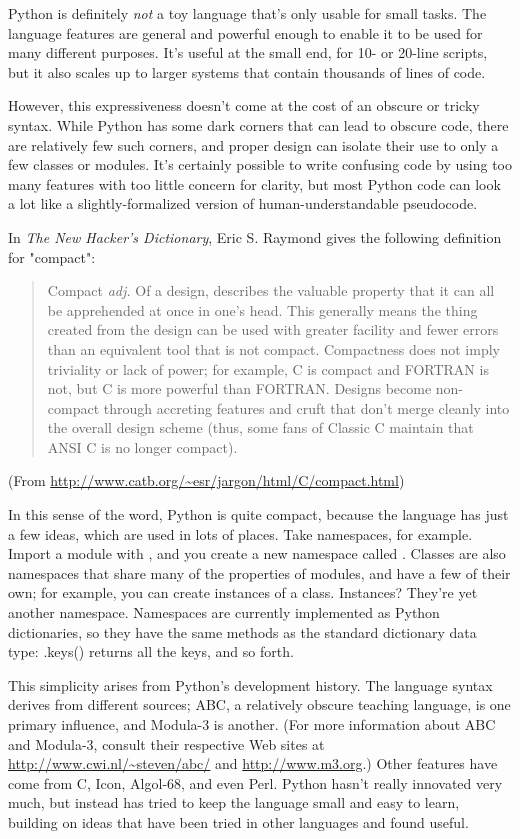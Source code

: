 \documentclass{howto}
\begin{document}
Python is definitely \emph{not} a toy language that's only usable for
small tasks.  The language features are general and powerful enough to
enable it to be used for many different purposes.  It's useful at the
small end, for 10- or 20-line scripts, but it also scales up to larger
systems that contain thousands of lines of code.

However, this expressiveness doesn't come at the cost of an obscure or
tricky syntax.  While Python has some dark corners that can lead to
obscure code, there are relatively few such corners, and proper design
can isolate their use to only a few classes or modules.  It's
certainly possible to write confusing code by using too many features
with too little concern for clarity, but most Python code can look a
lot like a slightly-formalized version of human-understandable
pseudocode.

In \emph{The New Hacker's Dictionary}, Eric S. Raymond gives the following
definition for "compact":

\begin{quotation}
	Compact \emph{adj.}  Of a design, describes the valuable property
	that it can all be apprehended at once in one's head. This
	generally means the thing created from the design can be used
	with greater facility and fewer errors than an equivalent tool
	that is not compact. Compactness does not imply triviality or
	lack of power; for example, C is compact and FORTRAN is not,
	but C is more powerful than FORTRAN. Designs become
	non-compact through accreting features and cruft that don't
	merge cleanly into the overall design scheme (thus, some fans
	of Classic C maintain that ANSI C is no longer compact).
\end{quotation}

(From \url{http://www.catb.org/~esr/jargon/html/C/compact.html})

In this sense of the word, Python is quite compact, because the
language has just a few ideas, which are used in lots of places.  Take
namespaces, for example.  Import a module with , and
you create a new namespace called .  Classes are also
namespaces that share many of the properties of modules, and have a
few of their own; for example, you can create instances of a class.
Instances?  They're yet another namespace.  Namespaces are currently
implemented as Python dictionaries, so they have the same methods as
the standard dictionary data type: .keys() returns all the keys, and
so forth.

This simplicity arises from Python's development history.  The
language syntax derives from different sources; ABC, a relatively
obscure teaching language, is one primary influence, and Modula-3 is
another.  (For more information about ABC and Modula-3, consult their
respective Web sites at \url{http://www.cwi.nl/~steven/abc/} and
\url{http://www.m3.org}.)  Other features have come from C, Icon,
Algol-68, and even Perl.  Python hasn't really innovated very much,
but instead has tried to keep the language small and easy to learn,
building on ideas that have been tried in other languages and found
useful.
\end{document}
